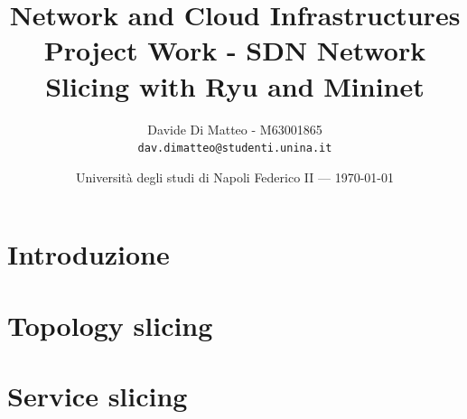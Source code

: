 \documentclass{article}
\title{Network and Cloud Infrastructures Project Work - SDN Network Slicing with Ryu and Mininet}
\author{Davide Di Matteo - M63001865 \\ \texttt{dav.dimatteo@studenti.unina.it}}
\date{Università degli studi di Napoli Federico II --- \today}
\begin{document}
\maketitle

\section*{Introduzione}


\section{Topology slicing}


\section{Service slicing}









\end{document}
